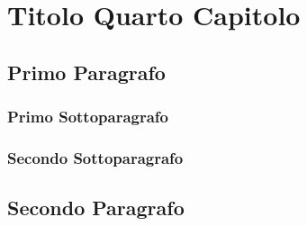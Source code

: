 \chapter{Titolo Quarto Capitolo}
\label{chap:titolocapitolo04}

\lipsum[1]

\section{Primo Paragrafo}
\lipsum[2-3]


\subsection{Primo Sottoparagrafo}
\lipsum[4-5]

\subsection{Secondo Sottoparagrafo}
\lipsum[6-7]

\section{Secondo Paragrafo}
\lipsum[1-7]
